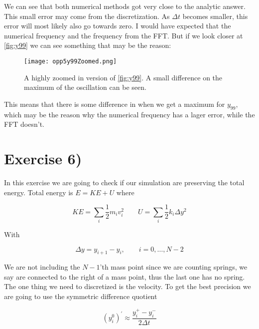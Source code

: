 \documentclass[a4paper,norsk, 10pt]{article}
\begin{document}
We can see that both numerical methods got very close to the analytic answer. This small error may come from the discretization. As $\Delta t$ becomes smaller, this error will most likely also go towards zero. I would have expected that the numerical frequency and the frequency from the FFT. But if we look closer at \ref{fig:y99} we can see something that may be the reason:

\begin{figure}[H]
\centering
\texttt{[image: opp5y99Zoomed.png]}
\caption{A highly zoomed in version of \ref{fig:y99}. A small difference on the maximum of the oscillation can be seen.}
\label{fig:y99Zoom}
\end{figure}

This means that there is some difference in when we get a maximum for $y_{99}$, which may be the reason why the numerical frequency has a lager error, while the FFT doesn't.














\section{Exercise 6)}
In this exercise we are going to check if our simulation are preserving the total energy. Total energy is $E = KE + U$ where

\begin{equation}
KE = \sum_i \frac{1}{2}m_iv_i^2 \qquad U = \sum_i \frac{1}{2}k_i\Delta y^2
\end{equation}

With

\begin{equation}
\Delta y = y_{i+1} - y_i, \qquad i = 0,\ldots,N-2
\end{equation} 

We are not including the $N-1$'th mass point since we are counting springs, we say are connected to the right of a mass point, thus the last one has no spring.\\

The one thing we need to discretized is the velocity. To get the best precision we are going to use the symmetric difference quotient

\begin{equation}
(y^{0}_i)^{'} \approx \frac{y_{i}^+-y_{i}^-}{2\Delta t}
\end{equation}
\end{document}
